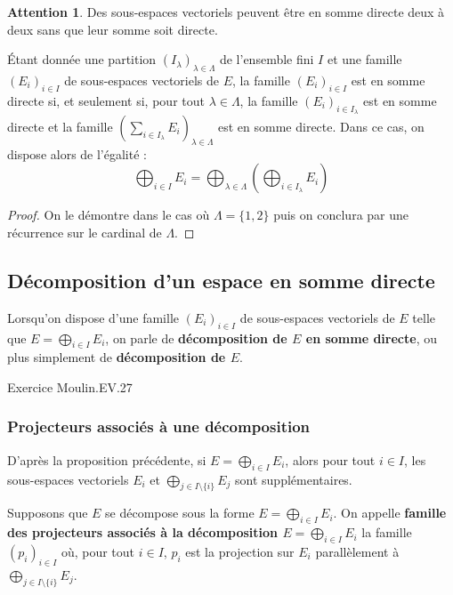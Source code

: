 \documentclass[french]{article}
\theoremstyle{plain}
\theoremstyle{definition}
\newtheorem*{attention}{Attention}
\theoremstyle{remark}
\begin{document}
\begin{attention}
	Des sous-espaces vectoriels peuvent être en somme directe deux à deux sans que leur somme soit directe.
\end{attention}

\begin{prop}%
	Étant donnée une partition $(I_\lambda)_{\lambda\in\Lambda}$ de l'ensemble fini $I$ et une famille $(E_i)_{i\in I}$ de sous-espaces vectoriels de $E$, la famille $(E_i)_{i\in I}$ est en somme directe si, et seulement si, pour tout $\lambda\in\Lambda$, la famille $(E_i)_{i\in I_\lambda}$ est en somme directe et la famille $\displaystyle\left(\sum_{i\in I_\lambda} E_i\right)_{\lambda\in\Lambda}$ est en somme directe. Dans ce cas, on dispose alors de l'égalité : $$\bigoplus_{i\in I} E_i=\bigoplus_{\lambda\in\Lambda}\left(\bigoplus_{i\in I_\lambda}E_i\right)$$
\end{prop}
\begin{proof}
	On le démontre dans le cas où $\Lambda=\{1,2\}$ puis on conclura par une récurrence sur le cardinal de $\Lambda$.
\end{proof}

\subsection{Décomposition d'un espace en somme directe}

Lorsqu'on dispose d'une famille $(E_i)_{i\in I}$ de sous-espaces vectoriels de $E$ telle que $E=\displaystyle\bigoplus_{i\in I}E_i$, on parle de \textbf{décomposition de $E$ en somme directe}, ou plus simplement de \textbf{décomposition de $E$}.

Exercice Moulin.EV.27

\subsubsection*{Projecteurs associés à une décomposition}
D'après la proposition précédente, si $E=\displaystyle\bigoplus_{i\in I}E_i$, alors pour tout $i\in I$, les sous-espaces vectoriels $E_i$ et $\displaystyle\bigoplus_{j\in I\setminus\{i\}}E_j$ sont supplémentaires.
\begin{dfn}
	Supposons que $E$ se décompose sous la forme $E=\displaystyle\bigoplus_{i\in I}E_i$. On appelle \textbf{famille des projecteurs associés à la décomposition $E=\displaystyle\bigoplus_{i\in I}E_i$} la famille $(p_i)_{i\in I}$ où, pour tout $i\in I$, $p_i$ est la projection sur $E_i$ parallèlement à $\displaystyle\bigoplus_{j\in I\setminus\{i\}}E_j$.
\end{dfn}
\end{document}
